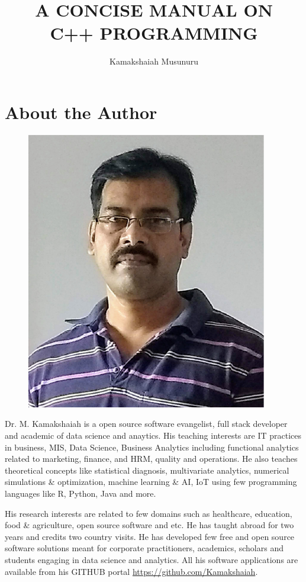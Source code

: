 \documentclass{book}
\title{{\small{A CONCISE MANUAL ON}} \\ C++ PROGRAMMING}
\author{Kamakshaiah Musunuru}
\date{}
\begin{document}
\maketitle

\chapter*{About the Author}

\begin{figure}[h]
\centering 
\includegraphics[scale=0.2]{self}%

\end{figure}

Dr. M. Kamakshaiah is a open source software evangelist, full stack developer and academic of data science and anaytics. His teaching interests are IT practices in business, MIS, Data Science, Business Analytics including functional analytics related to marketing, finance, and HRM, quality and operations. He also teaches theoretical concepts like statistical diagnosis, multivariate analytics, numerical simulations \& optimization, machine learning \& AI, IoT using few programming languages like R, Python, Java and more. 

His research interests are related to few domains such as healthcare, education, food \& agriculture, open source software and etc. He has taught abroad for two years and credits two country visits. He has developed few free and open source software solutions meant for corporate practitioners, academics, scholars and students engaging in data science and analytics. All his software applications are available from his GITHUB portal \url{https://github.com/Kamakshaiah}. 
\end{document}
